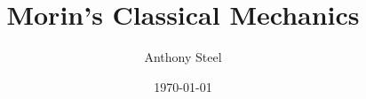 \documentclass[9pt]{report}
\begin{document}
\title{Morin's Classical Mechanics}
\author{Anthony Steel}
\date{\today}
\maketitle
\chapter{}
\chapter{}
\chapter{}
\chapter{}
\chapter{}
\chapter{}
\chapter{}
\end{document}
